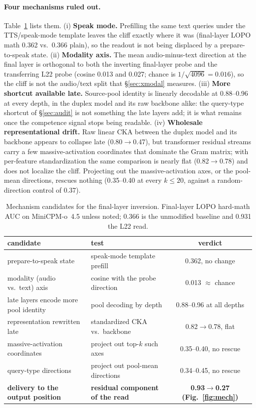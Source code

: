 \paragraph{Four mechanisms ruled out.} Table~\ref{tab:mech} lists them.
(i) \textbf{Speak mode.} Prefilling the same text queries under the
TTS/speak-mode template leaves the cliff exactly where it was
(final-layer LOPO math 0.362 vs.\ 0.366 plain), so the readout is not
being displaced by a prepare-to-speak state. (ii) \textbf{Modality axis.}
The mean audio-minus-text direction at the final layer is orthogonal
to both the inverting final-layer probe and the transferring L22 probe
(cosine 0.013 and 0.027; chance is $1/\sqrt{4096}=0.016$), so the
cliff is not the audio/text split that \S\ref{sec:xmodal} measures.
(iii) \textbf{More shortcut available late.} Source-pool identity is
linearly decodable at 0.88--0.96 at every depth, in the duplex
model and its raw backbone alike: the query-type shortcut of
\S\ref{sec:audit} is not something the late layers add; it is
what remains once the competence signal stops being readable.
(iv) \textbf{Wholesale representational drift.} Raw linear CKA between
the duplex model and its backbone appears to collapse late
(0.80$\to$0.47), but transformer residual streams carry a few
massive-activation coordinates that dominate the Gram matrix; with
per-feature standardization the same comparison is nearly flat
(0.82$\to$0.78) and does not localize the cliff. Projecting out the
massive-activation axes, or the pool-mean directions, rescues nothing
(0.35--0.40 at every $k\le20$, against a random-direction control of
0.37).

\begin{table}[h]
\centering\footnotesize
\caption{Mechanism candidates for the final-layer inversion. Final-layer
LOPO hard-math AUC on MiniCPM-o~4.5 unless noted; 0.366 is the
unmodified baseline and 0.931 the L22 read.}
\label{tab:mech}
\begin{tabular}{llc}
\toprule
candidate & test & verdict \\
\midrule
prepare-to-speak state & speak-mode template prefill & 0.362, no change \\
modality (audio vs.\ text) axis & cosine with the probe direction & 0.013 $\approx$ chance \\
late layers encode more pool identity & pool decoding by depth & 0.88--0.96 at all depths \\
representation rewritten late & standardized CKA vs.\ backbone & 0.82$\to$0.78, flat \\
massive-activation coordinates & project out top-$k$ such axes & 0.35--0.40, no rescue \\
query-type directions & project out pool-mean directions & 0.34--0.45, no rescue \\
\midrule
\textbf{delivery to the output position} & \textbf{residual component of the read} & \textbf{0.93$\to$0.27 (Fig.~\ref{fig:mech})} \\
\bottomrule
\end{tabular}
\end{table}

